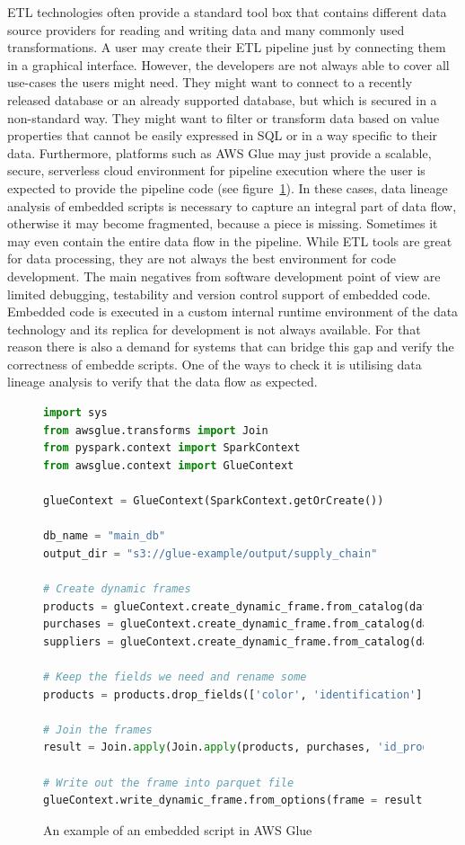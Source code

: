 ETL technologies often provide a standard tool box that contains different data source providers for reading and writing data and many commonly used transformations. A user may create their ETL pipeline just by connecting them in a graphical interface. However, the developers are not always able to cover all use-cases the users might need. They might want to connect to a recently released database or an already supported database, but which is secured in a non-standard way. They might want to filter or transform data based on value properties that cannot be easily expressed in SQL or in a way specific to their data. Furthermore, platforms such as AWS Glue may just provide a scalable, secure, serverless cloud environment for pipeline execution where the user is expected to provide the pipeline code (see figure~\ref{fig:embeddedScript}). In these cases, data lineage analysis of embedded scripts is necessary to capture an integral part of data flow, otherwise it may become fragmented, because a piece is missing. Sometimes it may even contain the entire data flow in the pipeline. While ETL tools are great for data processing, they are not always the best environment for code development. The main negatives from software development point of view are limited debugging, testability and version control support of embedded code. Embedded code is executed in a custom internal runtime environment of the data technology and its replica for development is not always available. For that reason there is also a demand for systems that can bridge this gap and verify the correctness of embedde scripts. One of the ways to check it is utilising data lineage analysis to verify that the data flow as expected.
\begin{figure}[ht]
\begin{lstlisting}[language=Python]
import sys
from awsglue.transforms import Join
from pyspark.context import SparkContext
from awsglue.context import GlueContext

glueContext = GlueContext(SparkContext.getOrCreate())

db_name = "main_db"
output_dir = "s3://glue-example/output/supply_chain"

# Create dynamic frames
products = glueContext.create_dynamic_frame.from_catalog(database=db_name, table_name="products_json")
purchases = glueContext.create_dynamic_frame.from_catalog(database=db_name, table_name="purchases_json")
suppliers = glueContext.create_dynamic_frame.from_catalog(database=db_name, table_name="suppliers_json")

# Keep the fields we need and rename some
products = products.drop_fields(['color', 'identification']).rename_field('name', 'product_name')

# Join the frames
result = Join.apply(Join.apply(products, purchases, 'id_product', 'product_id'), suppliers, 'supplier_id', 'id_supplier')

# Write out the frame into parquet file
glueContext.write_dynamic_frame.from_options(frame = result, connection_type = "s3", connection_options = {"path": output_dir}, format = "parquet")
\end{lstlisting}
\caption{An example of an embedded script in AWS Glue}
\label{fig:embeddedScript}
\end{figure}

